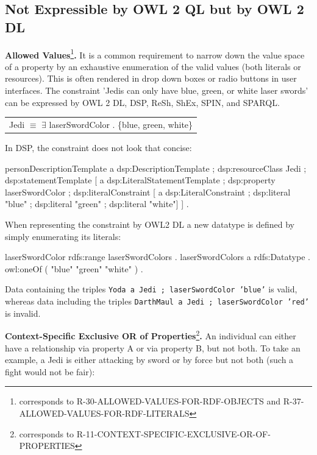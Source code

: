 \documentclass{llncs}
\newcommand{\ms}[1]{\texttt{#1}}
\newenvironment{DL}{
  \scriptsize
  \sffamily
  \vspace{0.3cm}
  \begin{tabular}{l}

}{
  \end{tabular}
  \linebreak
}
\begin{document}
\subsection{Not Expressible by OWL 2 QL but by OWL 2 DL}

\textbf{Allowed Values}\footnote{corresponds to R-30-ALLOWED-VALUES-FOR-RDF-OBJECTS and R-37-ALLOWED-VALUES-FOR-RDF-LITERALS}\textbf{.}
It is a common requirement to narrow down the value space of a property by an exhaustive enumeration of the valid values (both literals or resources). This is often rendered in drop down boxes or radio buttons in user interfaces. 
The constraint 'Jedis can only have blue, green, or white laser swords' can be expressed by OWL 2 DL, DSP, ReSh, ShEx, SPIN, and SPARQL.

\begin{DL}
Jedi $\equiv$ $\exists$ laserSwordColor . \{blue, green, white\} \\
\end{DL}

In DSP, the constraint does not look that concise:

\begin{ex}
personDescriptionTemplate
    a dsp:DescriptionTemplate ;
    dsp:resourceClass Jedi ;
    dsp:statementTemplate [
        a dsp:LiteralStatementTemplate ;
        dsp:property laserSwordColor ;
        dsp:literalConstraint [
            a dsp:LiteralConstraint ;
            dsp:literal "blue" ;
            dsp:literal "green" ;
            dsp:literal "white"] ] .
\end{ex}

When representing the constraint by OWL2 DL a new datatype is defined by simply enumerating its literals:

\begin{ex}
laserSwordColor rdfs:range laserSwordColors . 
laserSwordColors
    a rdfs:Datatype .
    owl:oneOf ( "blue" "green" "white" ) .
\end{ex}

Data containing the triples \ms{Yoda a Jedi ; laserSwordColor 'blue'} is valid, 
whereas data including the triples \ms{DarthMaul a Jedi ; laserSwordColor 'red'} is invalid.

\textbf{Context-Specific Exclusive OR of Properties}\footnote{corresponds to  R-11-CONTEXT-SPECIFIC-EXCLUSIVE-OR-OF-PROPERTIES}\textbf{.}
An individual can either have a relationship via property A or via property B, but not both.
To take an example, a Jedi is either attacking by sword or by force but not both (such a fight would not be fair):
\end{document}

